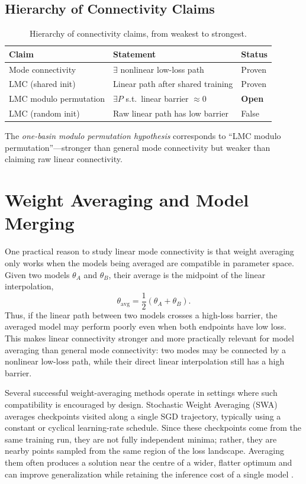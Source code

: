 \documentclass[11pt,a4paper]{report}
\begin{document}
\subsection{Hierarchy of Connectivity Claims}

\begin{table}[H]
    \centering
    \caption{Hierarchy of connectivity claims, from weakest to strongest.}
    \label{tab:hierarchy}
    \begin{tabular}{l l l}
        \toprule
        \textbf{Claim} & \textbf{Statement} & \textbf{Status} \\
        \midrule
        Mode connectivity & $\exists$ nonlinear low-loss path & Proven \\
        LMC (shared init) & Linear path after shared training & Proven \\
        LMC modulo permutation & $\exists P$ s.t.\ linear barrier $\approx 0$ & \textbf{Open} \\
        LMC (random init) & Raw linear path has low barrier & False \\
        \bottomrule
    \end{tabular}
\end{table}

The \textit{one-basin modulo permutation hypothesis} corresponds to ``LMC modulo permutation''---stronger than general mode connectivity but weaker than claiming raw linear connectivity.

\section{Weight Averaging and Model Merging}
\label{sec:weight_averaging}
One practical reason to study linear mode connectivity is that weight averaging 
only works when the models being averaged are compatible in parameter space. Given 
two models $\theta_A$ and $\theta_B$, their average is the midpoint of the linear 
interpolation,
\[
\theta_{\mathrm{avg}} = \frac{1}{2}(\theta_A + \theta_B).
\]
Thus, if the linear path between two models crosses a high-loss barrier, the 
averaged model may perform poorly even when both endpoints have low loss. This 
makes linear connectivity stronger and more practically relevant for model 
averaging than general mode connectivity: two modes may be connected by a nonlinear 
low-loss path, while their direct linear interpolation still has a high barrier.

Several successful weight-averaging methods operate in settings where such 
compatibility is encouraged by design. Stochastic Weight Averaging (SWA) averages 
checkpoints visited along a single SGD trajectory, typically using a constant or 
cyclical learning-rate schedule. Since these checkpoints come from the same 
training run, they are not fully independent minima; rather, they are nearby 
points sampled from the same region of the loss landscape. Averaging them often 
produces a solution near the centre of a wider, flatter optimum and can improve 
generalization while retaining the inference cost of a single model 
\citep{izmailov2018averaging}.
\end{document}
